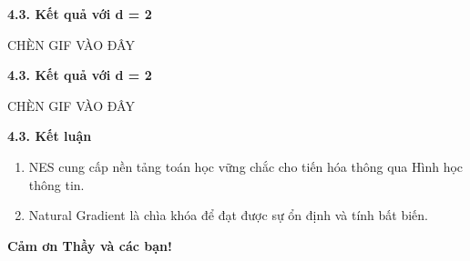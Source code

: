 \documentclass[10pt,xcolor=dvipsnames]{beamer}
\begin{document}
	\begin{frame}{\textbf{4.3. Kết quả với d = 2}}	
		\begin{center}
			CHÈN GIF VÀO ĐÂY
		\end{center}
	\end{frame}
	
	\begin{frame}{\textbf{4.3. Kết quả với d = 2}}	
		\begin{center}
			CHÈN GIF VÀO ĐÂY
		\end{center}
	\end{frame}
	
	\begin{frame}{\textbf{4.3. Kết luận}}
		\begin{enumerate}
			\item NES cung cấp nền tảng toán học vững chắc cho tiến hóa thông qua Hình học thông tin.
			\item Natural Gradient là chìa khóa để đạt được sự ổn định và tính bất biến.
		\end{enumerate}
		\vspace{0.5cm}
		\centering
		\LARGE \textbf{Cảm ơn Thầy và các bạn!}
	\end{frame}
	
\end{document}
